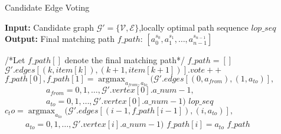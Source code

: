 \documentclass[a4paper,12pt]{article}
\begin{document}
 
\begin{CJK}{UTF8}{gbsn} 
\begin{algorithm} 
    \setcounter{algorithm}{1}
    \caption{Candidate Edge Voting} 
    \hspace*{0.02in} {\bf Input:} Candidate graph $\mathcal{G}'=\{\mathcal{V},\mathcal{E}\}$,locally optimal path sequence $lop\_seq$ \\ 
    \hspace*{0.02in} {\bf Output:} Final matching path $f\_path$: $[a_0^{s_0},a_1^{s_1},\dots,a_{n-1}^{s_{n-1}}]$
    \begin{algorithmic}[1]
    \iffalse
    \fi
	\State /*Let $f\_path[]$ denote the final matching path*/
	\State $f\_path=[]$
					\State $\mathcal{G}'.edges[(k,item[k]),(k+1,item[k+1])].vote++$
				\EndFor
			\EndFor
        \EndFor
	\State $f\_path[0],f\_path[1]=\mathop{\mathrm{argmax}}_{a_{from},a_{to}}{(\mathcal{G}'.edges[(0,a_{from}),(1,a_{to})],}$
	\State $\qquad \qquad \quad a_{from}=0,1,\dots,\mathcal{G}'.vertex[0].a\_num-1,$
	\State $\qquad \qquad \quad a_{to}=0,1,\dots,\mathcal{G}'.vertex[0].a\_num-1)$
	\State \Return $lop\_seq$
		\State $c_to = \mathop{\mathrm{argmax}}_{a_{to}}{(\mathcal{G}'.edges[(i-1,f\_path[i-1]),(i,a_{to})],}$
		\State $\qquad \, \, \, a_{to}=0,1,\dots,\mathcal{G}'.vertex[i].a\_num-1)$
		\State $f\_path[i]=a_{to}$
	\EndFor
	\State \Return $f\_path$
    \end{algorithmic} 
\end{algorithm}
\end{CJK} 
\end{document}

